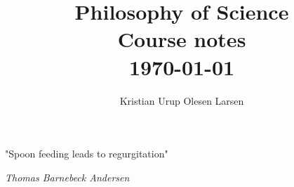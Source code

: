 \documentclass[12pt, a4paper]{article}
\begin{document}



\title{ Philosophy of Science  \\ \Large Course notes \\ \normalsize \today \\ 
} 
\author{\normalsize Kristian Urup Olesen Larsen}
\date{} %
\maketitle %
\setcounter{page}{1} %



\epigraph{"Spoon feeding leads to regurgitation"}{\textit{Thomas Barnebeck Andersen}}
\tableofcontents
\pagebreak
\end{document}
